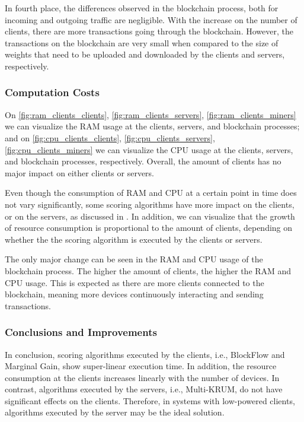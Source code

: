 In fourth place, the differences observed in the blockchain process, both for incoming and outgoing traffic are negligible. With the increase on the number of clients, there are more transactions going through the blockchain. However, the transactions on the blockchain are very small when compared to the size of weights that need to be uploaded and downloaded by the clients and servers, respectively.

\subsubsection{Computation Costs}

On \autoref{fig:ram_clients_clients}, \autoref{fig:ram_clients_servers}, \autoref{fig:ram_clients_miners} we can visualize the RAM usage at the clients, servers, and blockchain processes; and on \autoref{fig:cpu_clients_clients}, \autoref{fig:cpu_clients_servers}, \autoref{fig:cpu_clients_miners} we can visualize the CPU usage at the clients, servers, and blockchain processes, respectively. Overall, the amount of clients has no major impact on either clients or servers.

Even though the consumption of RAM and CPU at a certain point in time does not vary significantly, some scoring algorithms have more impact on the clients, or on the servers, as discussed in . In addition, we can visualize that the growth of resource consumption is proportional to the amount of clients, depending on whether the the scoring algorithm is executed by the clients or servers.

The only major change can be seen in the RAM and CPU usage of the blockchain process. The higher the amount of clients, the higher the RAM and CPU usage. This is expected as there are more clients connected to the blockchain, meaning more devices continuously interacting and sending transactions.

\subsubsection{Conclusions and Improvements}

In conclusion, scoring algorithms executed by the clients, i.e., BlockFlow and Marginal Gain, show super-linear execution time. In addition, the resource consumption at the clients increases linearly with the number of devices. In contrast, algorithms executed by the servers, i.e., Multi-KRUM, do not have significant effects on the clients. Therefore, in systems with low-powered clients, algorithms executed by the server may be the ideal solution.

